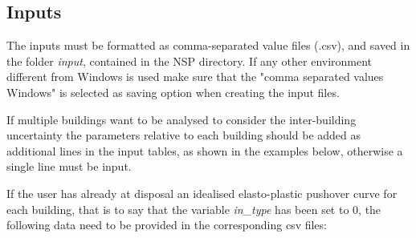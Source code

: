 \subsection{Inputs}
\label{subsec:InputCr}
The inputs must be formatted as comma-separated value files (.csv), and saved in the folder \textit{input}, contained in the NSP directory. If any other environment different from Windows is used make sure that the "comma separated values Windows" is selected as saving option when creating the input files. 

If multiple buildings want to be analysed to consider the inter-building uncertainty the parameters relative to each building should be added as additional lines in the input tables, as shown in the examples below, otherwise a single line must be input.

If the user has already at disposal an idealised elasto-plastic pushover curve for each building, that is to say that the variable \textit{in\_type} has been set to 0, the following data need to be provided in the corresponding csv files:

